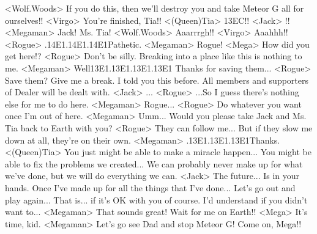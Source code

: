 <Wolf.Woods> If you do this, then we'll destroy you and take Meteor G all for ourselves!! 
<Virgo> You're finished, Tia!! 
<(Queen)Tia> {13}{EC}!! 
<Jack> !! 
<Megaman> Jack! Ms. Tia! 
<Wolf.Woods> Aaarrrgh!! 
<Virgo> Aaahhh!! 
<Rogue> .{14}{E1}.{14}{E1}.{14}{E1}Pathetic. 
<Megaman> Rogue! 
<Mega> How did you get here!? 
<Rogue> Don't be silly. 
Breaking into a place like this is nothing to me. 
<Megaman> Well{13}{E1}.{13}{E1}.{13}{E1}.{13}{E1} Thanks for saving them... 
<Rogue> Save them? Give me a break. 
I told you this before. All members and supporters of Dealer will be dealt with. 
<Jack> ... 
<Rogue> ...So I guess there's nothing else for me to do here. 
<Megaman> Rogue... 
<Rogue> Do whatever you want once I'm out of here. 
<Megaman> Umm... 
Would you please take Jack and Ms. Tia back to Earth with you? 
<Rogue> They can follow me... 
But if they slow me down at all, they're on their own. 
<Megaman> .{13}{E1}.{13}{E1}.{13}{E1}Thanks. 
<(Queen)Tia> You just might be able to make a miracle happen... 
You might be able to fix the problems we created... 
We can probably never make up for what we've done, but we will do everything we can. 
<Jack> The future... Is in your hands. 
Once I've made up for all the things that I've done... 
Let's go out and play again... 
That is... if it's OK with you of course. I'd understand if you didn't want to... 
<Megaman> That sounds great! Wait for me on Earth!! 
<Mega> It's time, kid. 
<Megaman> Let's go see Dad and stop Meteor G! 
Come on, Mega!! 
